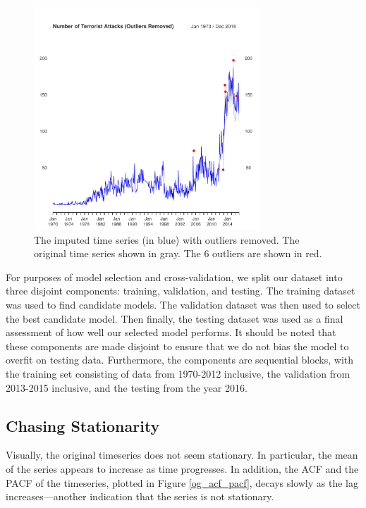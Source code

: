\documentclass[11pt]{paper}
\begin{document}
\begin{figure}
\centering
    \includegraphics[width=0.75\textwidth]{../image/outlier_comparison.pdf}
\caption{The imputed time series (in blue) with outliers removed. The original time series shown in gray. The 6 outliers are shown in red. }
\label{outlier}
\end{figure}



For purposes of model selection and cross-validation, we split our dataset into three disjoint components: training, validation, and testing. The training dataset was used to find candidate models. The validation dataset was then used to select the best candidate model. Then finally, the testing dataset was used as a final assessment of how well our selected model performs. It should be noted that these components are made disjoint to ensure that we do not bias the model to overfit on testing data. Furthermore, the components are sequential blocks, with the training set consisting of data from 1970-2012 inclusive, the validation from 2013-2015 inclusive, and the testing from the year 2016.


\subsection{Chasing Stationarity}
Visually, the original timeseries does not seem stationary. In particular, the mean of the series appears to increase as time progresses. In addition, the ACF and the PACF of the timeseries, plotted in Figure \ref{og_acf_pacf}, decays slowly as the lag increases---another indication that the series is not stationary.
\end{document}
